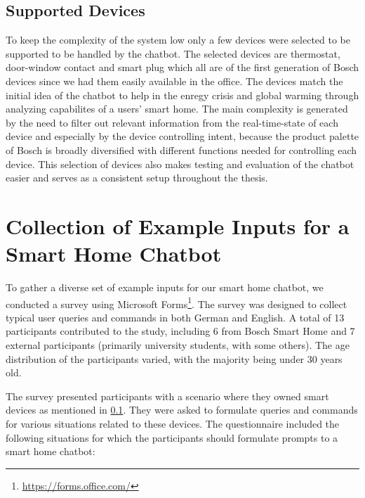 \subsection{Supported Devices}
\label{subsec:devices}
To keep the complexity of the system low only a few devices were selected to be supported to be handled by the chatbot.
The selected devices are thermostat, door-window contact and smart plug which all are of the first generation of Bosch devices since we had them easily available in the office.
The devices match the initial idea of the chatbot to help in the enregy crisis and global warming through analyzing capabilites of a users' smart home.
The main complexity is generated by the need to filter out relevant information from the real-time-state of each device and especially by the device controlling intent, because the product palette of Bosch is broadly diversified with different functions needed for controlling each device. 
This selection of devices also makes testing and evaluation of the chatbot easier and serves as a consistent setup throughout the thesis.

\section{Collection of Example Inputs for a Smart Home Chatbot}
\label{sec:collectinputs}
To gather a diverse set of example inputs for our smart home chatbot, we conducted a survey using Microsoft Forms\footnote{\url{https://forms.office.com/}}. The survey was designed to collect typical user queries and commands in both German and English. A total of 13 participants contributed to the study, including 6 from Bosch Smart Home and 7 external participants (primarily university students, with some others). The age distribution of the participants varied, with the majority being under 30 years old.

The survey presented participants with a scenario where they owned smart devices as mentioned in \cref{subsec:devices}. They were asked to formulate queries and commands for various situations related to these devices. The questionnaire included the following situations for which the participants should formulate prompts to a smart home chatbot:

